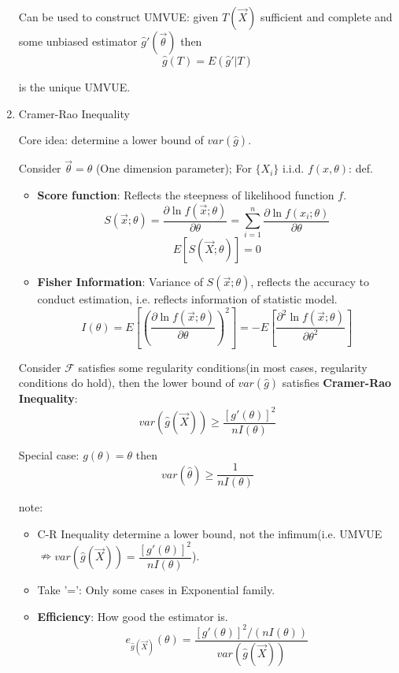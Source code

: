\documentclass[11pt,a4paper]{ctexart}
\numberwithin{equation}{section}%
\begin{document}
\begin{enumerate}
    Can be used to construct UMVUE: given $T(\vec{X})$ sufficient and complete and some unbiased estimator $\hat{g}\prime(\vec{\theta})$ then 
    \[
        \hat{g}(T)=E(\hat{g}\prime|T)    
    \]

    is the unique UMVUE.



\item Cramer-Rao Inequality

    Core idea: determine a lower bound of $var(\hat{g})$.

    Consider $\vec{\theta}=\theta$ (One dimension parameter); For $\{X_i\}$ i.i.d. $f(x,\theta)$: def.
    \begin{itemize}
        \item \textbf{Score function}: Reflects the steepness of likelihood function $f$.
        \[
            S(\vec{x};\theta)=\frac{\partial\ln f(\vec{x};\theta)}{\partial\theta}=\sum_{i=1}^n\frac{\partial\ln f(x_i;\theta)}{\partial\theta}
        \]
        \[E[S(\vec{X};\theta)]=0\]
        \item \textbf{Fisher Information}: Variance of $S(\vec{x};\theta)$, reflects the accuracy to conduct estimation, i.e. reflects information of statistic model.
        \[
            I(\theta)=E\left[\left(\frac{\partial \ln f(\vec{x};\theta)}{\partial\theta}\right)^2\right]=-E\left[\frac{\partial^2\ln f(\vec{x};\theta)}{\partial \theta^2}\right]
        \]
    \end{itemize}

    Consider $\mathscr{F}$ satisfies some regularity conditions(in most cases, regularity conditions do  hold), then the lower bound of $var(\hat{g})$ satisfies \textbf{Cramer-Rao Inequality}:
    \[
        var(\hat{g}(\vec{X}))\geq\frac{[g'(\theta)]^2}{nI(\theta)}
    \]

    Special case: $g(\theta)=\theta$ then
    \[
        var(\hat{\theta})\geq\frac{1}{nI(\theta)}    
    \]

    note:
    \begin{itemize}
        \item C-R Inequality determine a lower bound, not the infimum(i.e. UMVUE$\nRightarrow var(\hat{g}(\vec{X}))=\dfrac{[g'(\theta)]^2}{nI(\theta)}$).
        \item Take '=': Only some cases in Exponential family.
        \item \textbf{Efficiency}: How good the estimator is.
        \[
            e_{\hat{g}(\vec{X})}(\theta)=   \frac{[g'(\theta)]^2/(nI(\theta))}{var(\hat{g}(\vec{X}))} 
        \] 
    \end{itemize}



\end{enumerate}
\end{document}
